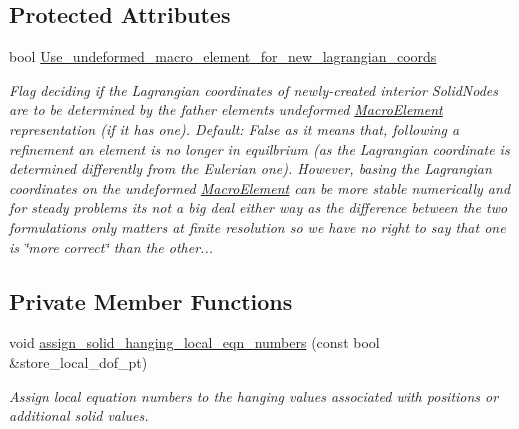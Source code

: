 \subsection*{Protected Attributes}
\begin{DoxyCompactItemize}
\item 
bool \hyperlink{classoomph_1_1RefineableSolidElement_a7a398d47d3eaf9af809821d806b65973}{Use\+\_\+undeformed\+\_\+macro\+\_\+element\+\_\+for\+\_\+new\+\_\+lagrangian\+\_\+coords}
\begin{DoxyCompactList}\small\item\em Flag deciding if the Lagrangian coordinates of newly-\/created interior Solid\+Nodes are to be determined by the father element\textquotesingle{}s undeformed \hyperlink{classoomph_1_1MacroElement}{Macro\+Element} representation (if it has one). Default\+: False as it means that, following a refinement an element is no longer in equilbrium (as the Lagrangian coordinate is determined differently from the Eulerian one). However, basing the Lagrangian coordinates on the undeformed \hyperlink{classoomph_1_1MacroElement}{Macro\+Element} can be more stable numerically and for steady problems it\textquotesingle{}s not a big deal either way as the difference between the two formulations only matters at finite resolution so we have no right to say that one is \char`\"{}more correct\char`\"{} than the other... \end{DoxyCompactList}\end{DoxyCompactItemize}
\subsection*{Private Member Functions}
\begin{DoxyCompactItemize}
\item 
void \hyperlink{classoomph_1_1RefineableSolidElement_a973020f4458c30aa458468b7f757ba7c}{assign\+\_\+solid\+\_\+hanging\+\_\+local\+\_\+eqn\+\_\+numbers} (const bool \&store\+\_\+local\+\_\+dof\+\_\+pt)
\begin{DoxyCompactList}\small\item\em Assign local equation numbers to the hanging values associated with positions or additional solid values. \end{DoxyCompactList}\end{DoxyCompactItemize}
